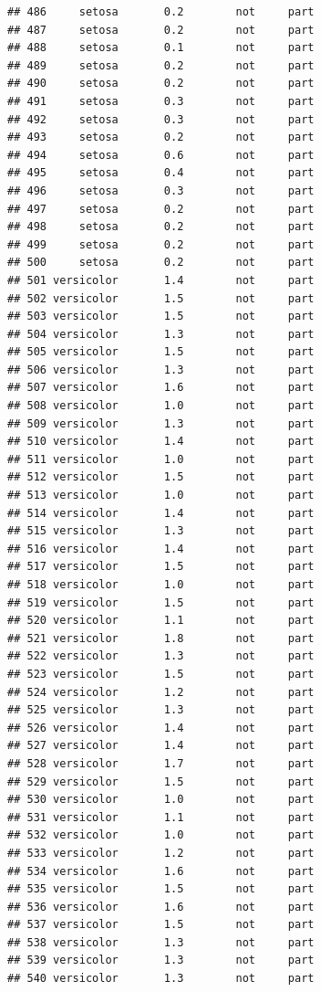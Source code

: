 \documentclass[krantz2]{krantz}\usepackage{knitr}%
\begin{document}
\begin{knitrout}
\begin{kframe}
\begin{verbatim}
## 486     setosa       0.2        not     part
## 487     setosa       0.2        not     part
## 488     setosa       0.1        not     part
## 489     setosa       0.2        not     part
## 490     setosa       0.2        not     part
## 491     setosa       0.3        not     part
## 492     setosa       0.3        not     part
## 493     setosa       0.2        not     part
## 494     setosa       0.6        not     part
## 495     setosa       0.4        not     part
## 496     setosa       0.3        not     part
## 497     setosa       0.2        not     part
## 498     setosa       0.2        not     part
## 499     setosa       0.2        not     part
## 500     setosa       0.2        not     part
## 501 versicolor       1.4        not     part
## 502 versicolor       1.5        not     part
## 503 versicolor       1.5        not     part
## 504 versicolor       1.3        not     part
## 505 versicolor       1.5        not     part
## 506 versicolor       1.3        not     part
## 507 versicolor       1.6        not     part
## 508 versicolor       1.0        not     part
## 509 versicolor       1.3        not     part
## 510 versicolor       1.4        not     part
## 511 versicolor       1.0        not     part
## 512 versicolor       1.5        not     part
## 513 versicolor       1.0        not     part
## 514 versicolor       1.4        not     part
## 515 versicolor       1.3        not     part
## 516 versicolor       1.4        not     part
## 517 versicolor       1.5        not     part
## 518 versicolor       1.0        not     part
## 519 versicolor       1.5        not     part
## 520 versicolor       1.1        not     part
## 521 versicolor       1.8        not     part
## 522 versicolor       1.3        not     part
## 523 versicolor       1.5        not     part
## 524 versicolor       1.2        not     part
## 525 versicolor       1.3        not     part
## 526 versicolor       1.4        not     part
## 527 versicolor       1.4        not     part
## 528 versicolor       1.7        not     part
## 529 versicolor       1.5        not     part
## 530 versicolor       1.0        not     part
## 531 versicolor       1.1        not     part
## 532 versicolor       1.0        not     part
## 533 versicolor       1.2        not     part
## 534 versicolor       1.6        not     part
## 535 versicolor       1.5        not     part
## 536 versicolor       1.6        not     part
## 537 versicolor       1.5        not     part
## 538 versicolor       1.3        not     part
## 539 versicolor       1.3        not     part
## 540 versicolor       1.3        not     part

\end{verbatim}
\end{kframe}
\end{knitrout}
\end{document}
